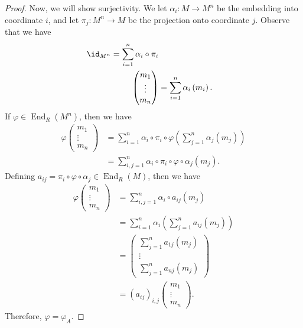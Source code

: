 \documentclass[10pt]{mypackage}
\begin{document}
\begin{proof}
  Now, we will show surjectivity. We let $\alpha_i \colon M\rightarrow M^{n}$ be the embedding into coordinate $i$, and let $\pi_j\colon M^{n}\rightarrow M$ be the projection onto coordinate $j$. Observe that we have
  \begin{align*}
    \id_{M^n} = \sum_{i=1}^{n}\alpha_i\circ\pi_i\\
    \begin{pmatrix}m_1\\\vdots\\m_n\end{pmatrix} &= \sum_{i=1}^{n} \alpha_i\left( m_i \right).
  \end{align*}
  If $\varphi\in \operatorname{End}_R\left(M^n\right)$, then we have
  \begin{align*}
    \varphi \begin{pmatrix}m_1\\\vdots\\m_n\end{pmatrix} &= \sum_{i=1}^{n} \alpha_i\circ \pi_i\circ \varphi\left( \sum_{j=1}^{n}\alpha_j\left( m_j \right) \right)\\
                                                         &= \sum_{i,j=1}^{n}\alpha_i\circ\pi_i\circ\varphi\circ\alpha_j\left( m_j \right).
  \end{align*}
  Defining $a_{ij} = \pi_i\circ\varphi\circ\alpha_j\in \operatorname{End}_R(M)$, then we have
  \begin{align*}
    \varphi \begin{pmatrix}m_1\\\vdots\\m_n\end{pmatrix} &= \sum_{i,j=1}^{n}\alpha_i\circ a_{ij}\left( m_j \right)\\
                                                         &= \sum_{i=1}^{n}\alpha_i\left( \sum_{j=1}^{n}a_{ij}\left( m_j \right) \right)\\
                                                         &= \begin{pmatrix}\sum_{j=1}^{n}a_{1j}\left( m_j \right)\\\vdots\\\sum_{j=1}^{n}a_{nj}\left( m_j \right)\end{pmatrix}\\
                                                         &= \left( a_{ij} \right)_{i,j} \begin{pmatrix}m_1\\\vdots\\m_n\end{pmatrix}.
  \end{align*}
  Therefore, $\varphi = \varphi_A$.
\end{proof}
\end{document}
